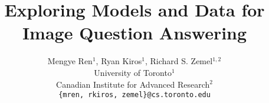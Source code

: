 

\author{
Mengye Ren${}^1$, Ryan Kiros${}^1$, Richard S. Zemel${}^{1, 2}$\\
University of Toronto${}^1$\\
Canadian Institute for Advanced Research${}^2$\\
\texttt{\{mren, rkiros, zemel\}@cs.toronto.edu}
}
\title{Exploring Models and Data for Image Question Answering}


\maketitle



